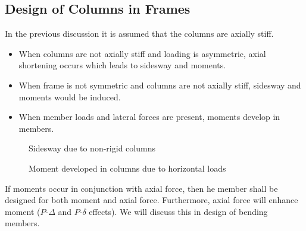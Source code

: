 \subsection{Design of Columns in Frames}
In the previous discussion it is assumed that the columns are axially stiff.
\begin{itemize}
\item When columns are not axially stiff and loading is asymmetric, axial shortening occurs which leads to sidesway and moments.
\item When frame is not symmetric and columns are not axially stiff, sidesway and moments would be induced.
\item When member loads and lateral forces are present, moments develop in members.
\end{itemize}
\begin{figure}[H]
\centering
\caption{Sidesway due to non-rigid columns}
\centering
\caption{Moment developed in columns due to horizontal loads}
\end{figure}
If moments occur in conjunction with axial force, then he member shall be designed for both moment and axial force. Furthermore, axial force will enhance moment ($P$-$\Delta$ and $P$-$\delta$ effects). We will discuss this in design of bending members.
